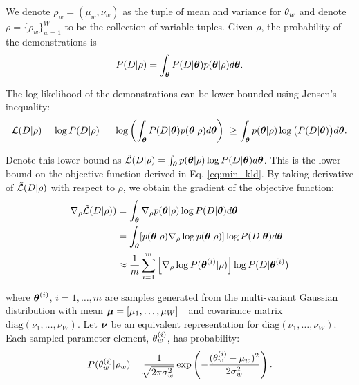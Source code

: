     We denote $\rho_w = (\mu_w, \nu_w)$ as the tuple of mean and variance for $\theta_{w}$ and denote $\rho
    =\{\rho_w\}_{w=1}^W$ to be the collection of variable tuples. Given $\rho$, the probability of the demonstrations is
    \[
        P(D |\rho) = \int_{\boldsymbol{\mathbb{\theta}} } P(D|\boldsymbol{\mathbb{\theta}}) p(\boldsymbol{\mathbb{\theta}} | \rho)d\boldsymbol{\mathbb{\theta}}.
    \]

    \noindent
     The log-likelihood of the demonstrations can be lower-bounded using Jensen's inequality:
    \begin{equation*}
    \mathcal{L}(D|\rho ) = \log P(D|\rho)\
         = \log \left( \int_{\boldsymbol{\mathbb{\theta}}}P(D|\boldsymbol{\mathbb{\theta}}) p(\boldsymbol{\mathbb{\theta}} | \rho)d\boldsymbol{\mathbb{\theta}} \right)\ \ge \int_{\boldsymbol{\mathbb{\theta}}}
            p(\boldsymbol{\mathbb{\theta}}|\rho)\log \big( P(D|\boldsymbol{\mathbb{\theta}}) \big) d\boldsymbol{\mathbb{\theta}}.
    \end{equation*}

    \par
    Denote this lower bound as $\tilde{\mathcal{L}}(D|\rho)=\int_{\boldsymbol{\mathbb{\theta}}} p(\boldsymbol{\mathbb{\theta}} |\rho) \log P(D|\boldsymbol{\mathbb{\theta}})
    d\boldsymbol{\mathbb{\theta}}$. This is the lower bound on the objective function derived in Eq. \ref{eq:min_kld}. By taking
    derivative of $\tilde{\mathcal{L}}(D|\rho)$ with respect to $\rho$, we obtain the gradient of the objective function:
    \begin{equation}\label{eq:gradLogLike}
        \begin{aligned}
            \nabla_\rho \tilde{\mathcal{L}}(D|\rho)) & =
                \int_{\boldsymbol{\mathbb{\theta}}}\nabla_\rho p(\boldsymbol{\mathbb{\theta}}|\rho) \log P(D|\boldsymbol{\mathbb{\theta}})d\boldsymbol{\mathbb{\theta}}\\
            & = \int_{\boldsymbol{\mathbb{\theta}}}[ p(\boldsymbol{\mathbb{\theta}}|\rho) \nabla_\rho \log p(\boldsymbol{\mathbb{\theta}}|\rho) ] \log P(D|\boldsymbol{\mathbb{\theta}})d\boldsymbol{\mathbb{\theta}}\\
            &\approx \frac{1}{m} \sum_{ i=1}^m \left[\nabla_\rho \log P(\boldsymbol{\mathbb{\theta}}^{(i)}|\rho) \right] \log
                P(D|\boldsymbol{\mathbb{\theta}}^{(i)})
        \end{aligned}
    \end{equation}

    \noindent
    where $\boldsymbol{\mathbb{\theta}}^{(i)}$, $i=1,\ldots, m$ are samples generated from the multi-variant Gaussian distribution with
    mean $\boldsymbol{\mathbb{\mu}} = [\mu_1,\ldots, \mu_W]^\top$ and covariance matrix $\mbox{diag}\left(\nu_1,\ldots, \nu_W\right)$.
    Let $\boldsymbol{\mathbb{\nu}}$ be an equivalent representation for $\mbox{diag}\left(\nu_1,\ldots, \nu_W\right)$. Each sampled
    parameter element, $\theta_{w}^{(i)}$, has probability:
    \[
        P(\theta_{w}^{(i)} | \rho_{w}) = \frac{1}{\sqrt[]{2\pi \sigma_w^2}}\exp
            \left( -\frac{(\theta_w^{(i)}-\mu_w)^2}{2\sigma_w^2} \right).
    \]

